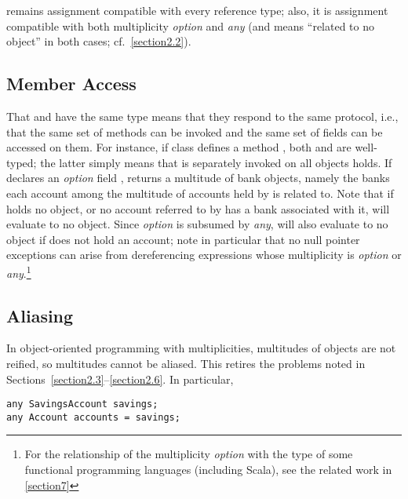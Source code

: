 {    remains assignment compatible with every reference type;
also, it is assignment compatible with both multiplicity \emph{option}
and \emph{any} (and means ``related to no object'' in both cases;
cf.~\autoref{section2.2}).

\subsection{Member Access}
\label{section3.4}

\noindent That  and  have the same type means
that they respond to the same protocol, i.e., that the same set of methods
can be invoked and the same set of fields can be accessed on them. For
instance, if class  defines a method , both
 and  are well-typed; the
latter simply means that  is separately invoked on all objects
 holds. If  declares an \emph{option} field ,
 returns a multitude of bank objects, namely the
banks each account among the multitude of accounts held by 
is related to. Note that if  holds no object, or no account
referred to by  has a bank associated with it,
 will evaluate to no object. Since \emph{option} is
subsumed by \emph{any},  will also evaluate to no object
if  does not hold an account; note in particular that no null
pointer exceptions can arise from dereferencing expressions whose
multiplicity is \emph{option} or \emph{any}.\footnote{For the relationship of the multiplicity \emph{option}
with the type  of some functional programming languages
(including Scala), see the related work in \autoref{section7}}

\subsection{Aliasing}
\label{section3.5}

\noindent In object-oriented programming with multiplicities, multitudes of
objects are not reified, so multitudes cannot be aliased. This retires the
problems noted in Sections~\ref{section2.3}--\ref{section2.6}. In particular,

\begin{lstlisting}
any SavingsAccount savings;
any Account accounts = savings;
\end{lstlisting}

}
